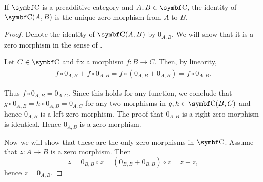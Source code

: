 \begin{proposition}\label{def:preadditive_zero_morphisms}
  If \( \Cat{C} \) is a preadditive category and \( A, B \in \Cat{C} \), the identity of \( \Cat{C}(A, B) \) is the unique zero morphism from \( A \) to \( B \).
\end{proposition}
\begin{proof}
  Denote the identity of \( \Cat{C}(A, B) \) by \( 0_{A,B} \). We will show that it is a zero morphism in the sense of .

  Let \( C \in \Cat{C} \) and fix a morphism \( f: B \to C \). Then, by linearity,
  \begin{align*}
    f \circ 0_{A,B} + f \circ 0_{A,B}
    =
    f \circ (0_{A,B} + 0_{A,B})
    =
    f \circ 0_{A,B}.
  \end{align*}

  Thus \( f \circ 0_{A,B} = 0_{A,C} \). Since this holds for any function, we conclude that \( g \circ 0_{A,B} = h \circ 0_{A,B} = 0_{A,C} \) for any two morphisms in \( g, h \in \Cat{C}(B,C) \) and hence \( 0_{A,B} \) is a left zero morphism. The proof that \( 0_{A,B} \) is a right zero morphism is identical. Hence \( 0_{A,B} \) is a zero morphism.

  Now we will show that these are the only zero morphisms in \( \Cat{C} \). Assume that \( z: A \to B \) is a zero morphism. Then
  \begin{equation*}
    z = 0_{B,B} \circ z = (0_{B,B} + 0_{B,B}) \circ z = z + z,
  \end{equation*}
  hence \( z = 0_{A,B} \).
\end{proof}

